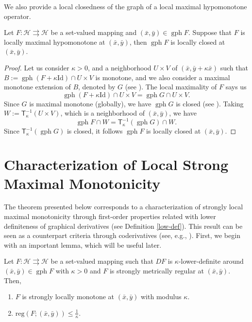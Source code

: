 \documentclass[smallextended,envcountsect,envcountsame]{svjour3}
\newcounter{count}
\renewcommand{\H}{\mathcal{H}}
\newcommand{\tto}{\rightrightarrows}
\newcommand{\gph}{\operatorname{gph}}
\newcommand{\1}{\mathds{1}}
\begin{document}
	We also provide a local closedness of the graph of a local maximal hypomonotone operator.
	\begin{lemma}\label{local-closed}
		Let $F\colon \H\tto\H$ be a set-valued mapping and $(\bar x,\bar y)\in \gph F$. Suppose that $F$ is locally maximal hypomonotone at $(\bar x,\bar y)$, then $\gph F$ is locally closed at $(\bar x,\bar y)$.
	\end{lemma}
	
	\begin{proof}
		Let us consider $\kappa>0$, and a neighborhood $U\times V$ of $(\bar x,\bar y + \kappa \bar x)$ such that $B := \gph (F+\kappa\text{Id})\cap U\times V$ is monotone, and we also consider a maximal monotone extension of $B$, denoted by $G$ (see \cite[Theorem 20.21]{MR3616647}). The local maximality of $F$ says us $$\gph (F+\kappa\text{Id})\cap U\times V = \gph G\cap U\times V.$$ Since $G$ is maximal monotone (globally), we have $\gph G$ is closed (see \cite[Proposition 20.38 (iii)]{MR3616647}). Taking $W := \mathsf{T}_{\kappa}^{-1}(U\times V)$, which is a neighborhood of $(\bar x,\bar y)$, we have $$\gph F\cap W = \mathsf{T}_{\kappa}^{-1}(\gph G)\cap W.$$
		Since $\mathsf{T}_{\kappa}^{-1}(\gph G)$ is closed, it follows $\gph F$ is locally closed at $(\bar x,\bar y)$.
	\end{proof}
	
	\section{Characterization of Local Strong Maximal Monotonicity}
	
	The theorem presented below corresponds to a characterization of strongly local maximal monotonicity through first-order properties related with lower definiteness of graphical derivatives (see Definition \ref{low-def}). This result can be seen as a counterpart criteria through coderivatives (see, e.g., \cite[Theorem 3.4]{MR3485980}). First, we begin with an important lemma, which will be useful later.
	
	\begin{lemma}\label{lem-met-reg}
		Let $F\colon \H\tto \H$ be a set-valued mapping such that  $DF$ is $\kappa$-lower-definite around  $(\bar x,\bar y)\in \gph F$ with $\kappa>0$ and $F$ is strongly metrically regular at $(\bar x,\bar y)$. Then, 
		\begin{enumerate}
			\item [(a)] $F$ is strongly locally monotone at $(\bar x,\bar y)$ with modulus $\kappa$.
			\item [(b)] $\text{reg}(F;(\bar x,\bar y))\leq \frac{1}{\kappa}$.
		\end{enumerate}
	\end{lemma}
	
\end{document}
